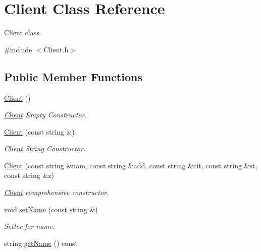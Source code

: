 \hypertarget{classClient}{}\section{Client Class Reference}
\label{classClient}


\hyperlink{classClient}{Client} class.  




{\ttfamily \#include $<$Client.\+h$>$}

\subsection*{Public Member Functions}
\begin{DoxyCompactItemize}
\item 
\hyperlink{classClient_ae51af7aa6b8f591496a8f6a4a87a14bf}{Client} ()\hypertarget{classClient_ae51af7aa6b8f591496a8f6a4a87a14bf}{}\label{classClient_ae51af7aa6b8f591496a8f6a4a87a14bf}

\begin{DoxyCompactList}\small\item\em \hyperlink{classClient}{Client} Empty Constructor. \end{DoxyCompactList}\item 
\hyperlink{classClient_a98a182defc2726dfa8796062cebb199c}{Client} (const string \&)
\begin{DoxyCompactList}\small\item\em \hyperlink{classClient}{Client} String Constructor. \end{DoxyCompactList}\item 
\hyperlink{classClient_a2581a22e25217aafda77c410ee67092c}{Client} (const string \&nam, const string \&add, const string \&cit, const string \&st, const string \&z)
\begin{DoxyCompactList}\small\item\em \hyperlink{classClient}{Client} comprehensive constructor. \end{DoxyCompactList}\item 
void \hyperlink{classClient_ab78b7ecbedb2d6fc0e0df3dfa8c973bc}{set\+Name} (const string \&)\hypertarget{classClient_ab78b7ecbedb2d6fc0e0df3dfa8c973bc}{}\label{classClient_ab78b7ecbedb2d6fc0e0df3dfa8c973bc}

\begin{DoxyCompactList}\small\item\em Setter for name. \end{DoxyCompactList}\item 
string \hyperlink{classClient_a28a677584ad4793b50b31c2e75039e2c}{get\+Name} () const \hypertarget{classClient_a28a677584ad4793b50b31c2e75039e2c}{}\label{classClient_a28a677584ad4793b50b31c2e75039e2c}


\end{DoxyCompactItemize}
